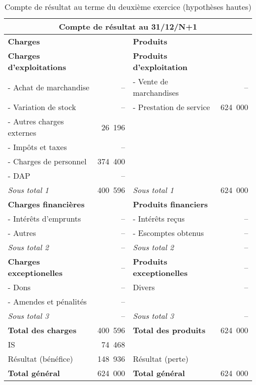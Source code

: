 		\begin{table}[h]
		  \centering
		  \begin{tabular}{|l|r|l|r|}
			\hline
			\multicolumn{4}{|c|}{\bf Compte de r\'esultat au 31/12/N+1}\\
			\hline
			{\bf Charges} & & {\bf Produits} & \\
			\hline
			{\bf Charges d'exploitations} & & {\bf Produits d'exploitation} & \\
			- Achat de marchandise & -- & - Vente de marchandises & --\\
			- Variation de stock & -- & - Prestation de service & 624~000\\
			- Autres charges externes & 26~196 & & \\
			- Impôts et taxes & -- & & \\
			- Charges de personnel & 374~400 & & \\
			- DAP & -- & & \\
			\cline{2-2}\cline{4-4}
			{\it Sous total 1} & 400~596 & {\it Sous total 1} & 624~000\\
			\cline{2-2}\cline{4-4}
			{\bf Charges financi\`eres} & & {\bf Produits financiers} & \\
			- Int\'er\^ets d'emprunts & -- & - Int\'er\^ets re\c cus & --\\
			- Autres & -- & - Escomptes obtenus & -- \\
			\cline{2-2}\cline{4-4}
			{\it Sous total 2} & -- & {\it Sous total 2} & -- \\
			\cline{2-2}\cline{4-4}
			{\bf Charges exceptionelles} & -- & {\bf Produits exceptionelles} & --\\
			- Dons & -- & Divers & --\\
			- Amendes et p\'enalit\'es & -- & & \\
			\cline{2-2}\cline{4-4}
			{\it Sous total 3} & -- & {\it Sous total 3} & -- \\
			\cline{2-2}\cline{4-4}
			{\bf Total des charges} & 400~596 & {\bf Total des produits} & 624~000 \\
			\cline{2-2}\cline{4-4}
			IS & 74~468 & & \\
			R\'esultat (b\'en\'efice) & 148~936 & R\'esultat (perte) & \\
			\cline{2-2}\cline{4-4}
			{\bf Total g\'en\'eral} & 624~000 & {\bf Total g\'en\'eral} & 624~000\\
			\hline
		  \end{tabular}
		  \caption{Compte de r\'esultat au terme du deuxi\`eme exercice (hypoth\`eses hautes)}
		  \label{tab:hypHN1}
		\end{table}
		
